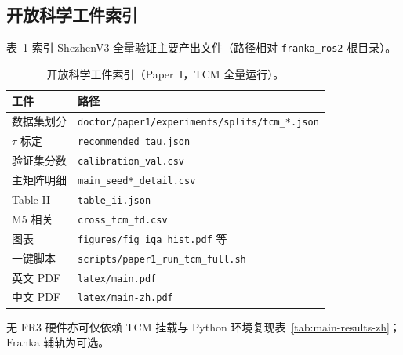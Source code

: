 \subsection{开放科学工件索引}
\label{sec:artifacts-zh}

表~\ref{tab:artifacts-zh} 索引 ShezhenV3 全量验证主要产出文件（路径相对 \texttt{franka\_ros2} 根目录）。

\begin{table}[t]
\centering
\caption{开放科学工件索引（Paper~I，TCM 全量运行）。}
\label{tab:artifacts-zh}
\scriptsize
\begin{tabular}{ll}
\hline
工件 & 路径 \\
\hline
数据集划分 & \texttt{doctor/paper1/experiments/splits/tcm\_*.json} \\
$\tau$ 标定 & \texttt{recommended\_tau.json} \\
验证集分数 & \texttt{calibration\_val.csv} \\
主矩阵明细 & \texttt{main\_seed*\_detail.csv} \\
Table II & \texttt{table\_ii.json} \\
M5 相关 & \texttt{cross\_tcm\_fd.csv} \\
图表 & \texttt{figures/fig\_iqa\_hist.pdf} 等 \\
一键脚本 & \texttt{scripts/paper1\_run\_tcm\_full.sh} \\
英文 PDF & \texttt{latex/main.pdf} \\
中文 PDF & \texttt{latex/main-zh.pdf} \\
\hline
\end{tabular}
\end{table}

无 FR3 硬件亦可仅依赖 TCM 挂载与 Python 环境复现表~\ref{tab:main-results-zh}；Franka 辅轨为可选。

